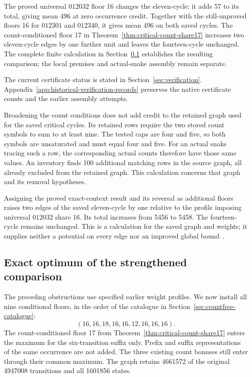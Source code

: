 \documentclass[11pt,a4paper]{article}
\theoremstyle{definition}
\theoremstyle{remark}
\begin{document}
The proved universal $012032$ floor 16 changes the eleven-cycle: it adds
57 to its total, giving mean 496 at zero occurrence credit. Together with
the still-unproved floors 16 for $012301$ and $012340$, it gives mean 496
on both saved cycles. The count-conditioned floor 17 in
Theorem~\ref{thm:critical-count-share17} increases two eleven-cycle edges
by one further unit and leaves the fourteen-cycle unchanged. The complete
finite calculation in Section~\ref{sec:range156} establishes the resulting
comparison; the local premises and actual-snake assembly remain separate.

The current certificate status is stated in Section~\ref{sec:verification}.
Appendix~\ref{app:historical-verification-records} preserves the native
certificate counts and the earlier assembly attempts.

Broadening the count conditions does not add credit to the retained graph
used for the saved critical cycles. Its retained rows require the two
stored count symbols to sum to at least nine. The tested caps are four
and five, so both symbols are unsaturated and must equal four and five.
For an actual snake tracing such a row, the corresponding actual counts
therefore have those same values. An inventory finds 100 additional matching rows in the
source graph, all already excluded from the retained graph. This
calculation concerns that graph and its removal hypotheses.

Assigning the proved exact-context result and its reversal as additional
floors raises two edges of the saved eleven-cycle by one relative to the
profile imposing universal $012032$ share 16. Its total increases from
5456 to 5458. The fourteen-cycle remains unchanged. This is a calculation
for the saved graph and weights; it supplies neither a potential on every
edge nor an improved global bound~\cite{critical153archive,share155archive}.


\subsection{Exact optimum of the strengthened comparison}\label{sec:range156}
The preceding obstructions use specified earlier weight profiles. We now
install all nine conditional floors, in the order of the catalogue in
Section~\ref{sec:countfree-catalogue}:
\[
(16,16,18,16,16,12,16,16,16).
\]
The count-conditioned floor 17 from
Theorem~\ref{thm:critical-count-share17} enters the maximum for the
six-transition suffix only. Prefix and suffix representations of the same
occurrence are not added. The three existing count bonuses still enter
through their common maximum. The graph retains 4661572 of the original
4947008 transitions and all 1601856 states.
\end{document}
